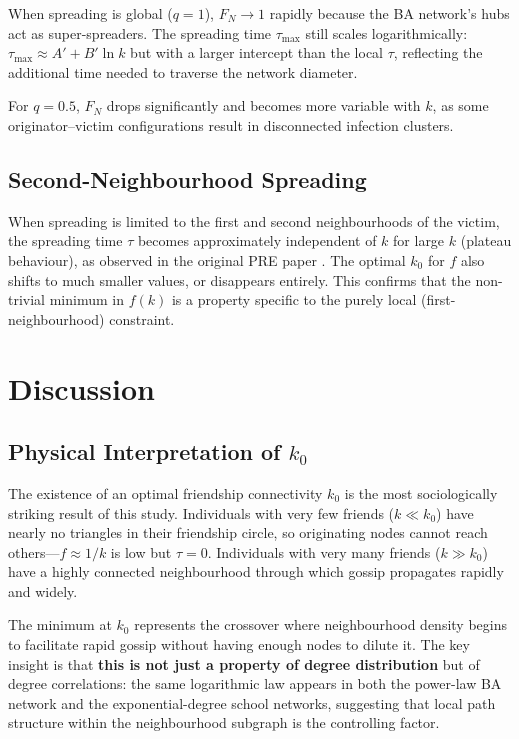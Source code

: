 \documentclass[9pt,a4paper,twocolumn,twoside]{tau-class/tau}
\begin{document}
When spreading is global ($q=1$), $F_N \to 1$ rapidly because the BA network's hubs act as super-spreaders. The spreading time $\tau_{\max}$ still scales logarithmically: $\tau_{\max} \approx A' + B' \ln k$ but with a larger intercept than the local $\tau$, reflecting the additional time needed to traverse the network diameter.

For $q = 0.5$, $F_N$ drops significantly and becomes more variable with $k$, as some originator--victim configurations result in disconnected infection clusters.

\subsection{Second-Neighbourhood Spreading}

When spreading is limited to the first and second neighbourhoods of the victim, the spreading time $\tau$ becomes approximately independent of $k$ for large $k$ (plateau behaviour), as observed in the original PRE paper \cite{lind2007pre}. The optimal $k_0$ for $f$ also shifts to much smaller values, or disappears entirely. This confirms that the non-trivial minimum in $f(k)$ is a property specific to the purely local (first-neighbourhood) constraint.

\section{Discussion}\label{sec:discussion}

\subsection{Physical Interpretation of $k_0$}

The existence of an optimal friendship connectivity $k_0$ is the most sociologically striking result of this study. Individuals with very few friends ($k \ll k_0$) have nearly no triangles in their friendship circle, so originating nodes cannot reach others---$f \approx 1/k$ is low but $\tau = 0$. Individuals with very many friends ($k \gg k_0$) have a highly connected neighbourhood through which gossip propagates rapidly and widely.

The minimum at $k_0$ represents the crossover where neighbourhood density begins to facilitate rapid gossip without having enough nodes to dilute it. The key insight is that \textbf{this is not just a property of degree distribution} but of degree correlations: the same logarithmic law appears in both the power-law BA network and the exponential-degree school networks, suggesting that local path structure within the neighbourhood subgraph is the controlling factor.
\end{document}
